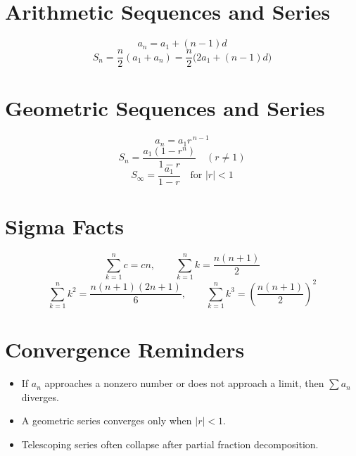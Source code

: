 \documentclass[11pt]{article}
\begin{document}
\section*{Arithmetic Sequences and Series}
\[
a_n=a_1+(n-1)d
\]
\[
S_n=\frac{n}{2}(a_1+a_n)=\frac{n}{2}\bigl(2a_1+(n-1)d\bigr)
\]

\section*{Geometric Sequences and Series}
\[
a_n=a_1r^{\,n-1}
\]
\[
S_n=\frac{a_1(1-r^n)}{1-r}\quad (r\ne 1)
\]
\[
S_\infty=\frac{a_1}{1-r}\quad \text{for } |r|<1
\]

\section*{Sigma Facts}
\[
\sum_{k=1}^n c=cn,\qquad
\sum_{k=1}^n k=\frac{n(n+1)}{2}
\]
\[
\sum_{k=1}^n k^2=\frac{n(n+1)(2n+1)}{6},\qquad
\sum_{k=1}^n k^3=\left(\frac{n(n+1)}{2}\right)^2
\]

\section*{Convergence Reminders}
\begin{itemize}
  \item If $a_n$ approaches a nonzero number or does not approach a limit, then $\sum a_n$ diverges.
  \item A geometric series converges only when $|r|<1$.
  \item Telescoping series often collapse after partial fraction decomposition.
\end{itemize}
\end{document}
